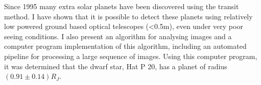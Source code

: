 Since 1995 many extra solar planets have been discovered using the transit method. I have shown that it is possible to detect these planets using relatively low powered ground based optical telescopes (<0.5m), even under very poor seeing conditions. I also present an algorithm for analysing images and a computer program implementation of this algorithm, including an automated pipeline for processing a large sequence of images. Using this computer program, it was determined that the dwarf star, Hat P 20, has a planet of radius $(0.91\pm0.14) R_J$.
